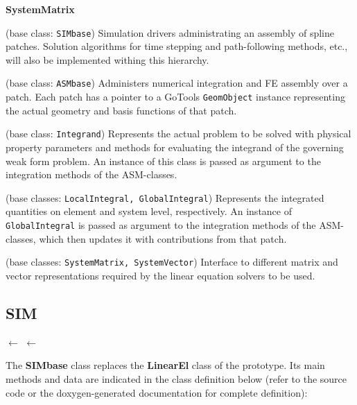 \documentclass{article}
\begin{document}
\begin{namelist}{\bf SystemMatrix}
\item[{\bf SIM}] (base class: {\tt SIMbase})
Simulation drivers administrating an assembly of spline patches.
Solution algorithms for time stepping and path-following methods, etc., will
also be implemented withing this hierarchy.
\item[{\bf ASM}] (base class: {\tt ASMbase})
Administers numerical integration and FE assembly over a patch.
Each patch has a pointer to a GoTools {\tt GeomObject} instance representing
the actual geometry and basis functions of that patch.
\item[{\bf Integrand}] (base class: {\tt Integrand})
Represents the actual problem to be solved with physical property parameters
and methods for evaluating the integrand of the governing weak form problem.
An instance of this class is passed as argument to the integration methods
of the ASM-classes.
\item[{\bf Integral}] (base classes: {\tt LocalIntegral, GlobalIntegral})
Represents the integrated quantities on element and system level, respectively.
An instance of {\tt GlobalIntegral} is passed as argument to the integration
methods of the ASM-classes, which then updates it with contributions from that
patch.
\item[{\bf SystemMatrix}] (base classes: {\tt SystemMatrix, SystemVector})
Interface to different matrix and vector representations required by
the linear equation solvers to be used.
\end{namelist}
\clearpage

\subsection{SIM}
\begin{center}
 $\longleftarrow$
 $\longleftarrow$
\end{center}
The {\bf SIMbase} class replaces the {\bf LinearEl} class of the prototype.
Its main methods and data are indicated in the class definition below (refer to
the source code or the doxygen-generated documentation for complete definition):
\end{document}
